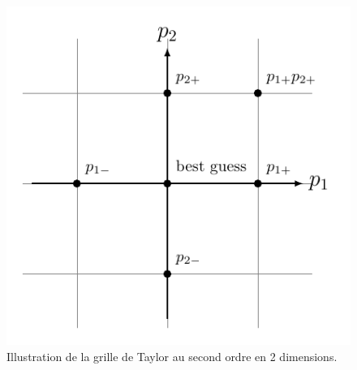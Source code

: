 \begin{figure}
\begin{center}
\includegraphics[width=0.5\columnwidth]{Figures/Dari/simulation_grid.pdf}
\caption{Illustration de la grille de Taylor au second ordre en 2 dimensions.}
\label{fig:taylor_grid}
\end{center}
\end{figure}

